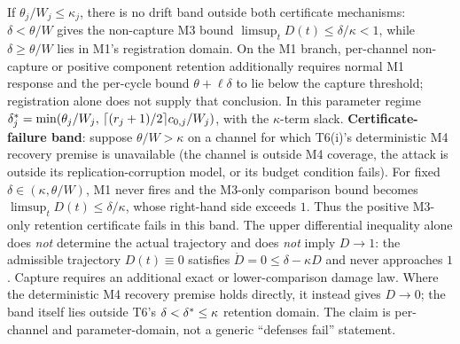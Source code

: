\begin{corollary}\label{cor:blindzone}
If $\theta_j/W_j\le\kappa_j$, there is no drift band outside both
certificate mechanisms: $\delta<\theta/W$ gives the non-capture M3 bound
$\limsup_tD(t)\le\delta/\kappa<1$, while $\delta\ge\theta/W$ lies in M1's
registration domain. On the M1 branch, per-channel non-capture or positive
component retention additionally requires normal M1 response and the per-cycle bound
$\theta+\ell\delta$ to lie below the capture threshold; registration alone
does not supply that conclusion. In this parameter regime
$\delta^{*}_j=\min(\theta_j/W_j,\,
\lceil(r_j+1)/2\rceil c_{0,j}/W_j)$, with the $\kappa$-term slack.
\textbf{Certificate-failure band}: suppose $\theta/W>\kappa$ on a channel for
which T6(i)'s deterministic M4 recovery premise is unavailable (the channel
is outside M4 coverage, the attack is outside its replication-corruption
model, or its budget condition fails). For fixed
$\delta\in(\kappa,\theta/W)$, M1 never fires and the M3-only comparison bound
becomes $\limsup_tD(t)\le\delta/\kappa$, whose right-hand side exceeds $1$.
Thus the positive M3-only retention certificate fails in this band. The
upper differential inequality alone does \emph{not} determine the actual
trajectory and does \emph{not} imply $D\to1$: the admissible trajectory
$D(t)\equiv0$ satisfies $\dot D=0\le\delta-\kappa D$ and never approaches
$1$. Capture requires an additional exact or lower-comparison damage law.
Where the deterministic M4 recovery premise holds directly, it instead gives
$D\to0$; the band itself lies outside T6's $\delta<\delta^{*}\le\kappa$
retention domain.
The claim is per-channel and parameter-domain, not a generic ``defenses
fail'' statement.
\end{corollary}

